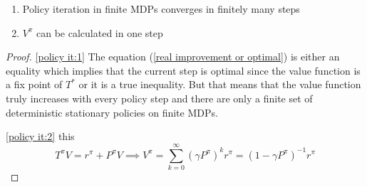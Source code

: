 \begin{corollary}\leavevmode
	\begin{enumerate}[label=(\roman*), font=\normalfont]
		\item\label{policy it:1} Policy iteration in finite MDPs converges in finitely many steps
		\item\label{policy it:2} \(V^\pi\) can be calculated in one step 
	   
   \end{enumerate}
\end{corollary}
\begin{proof}
	\ref{policy it:1} The equation (\ref{real improvement or optimal}) is either an equality which implies that the current step is optimal since the value function is a fix point of \(T^*\) or it is a true inequality. But that means that the value function truly increases with every policy step and there are only a finite set of deterministic stationary policies on finite MDPs.

	\ref{policy it:2} this 
	\[
		   T^\pi V= r^\pi +P^\pi V \implies V^\pi = \sum_{k=0}^\infty (\gamma P^\pi)^k r^\pi = (1-\gamma P^\pi)^{-1} r^\pi
	\]
\end{proof}







\endinput